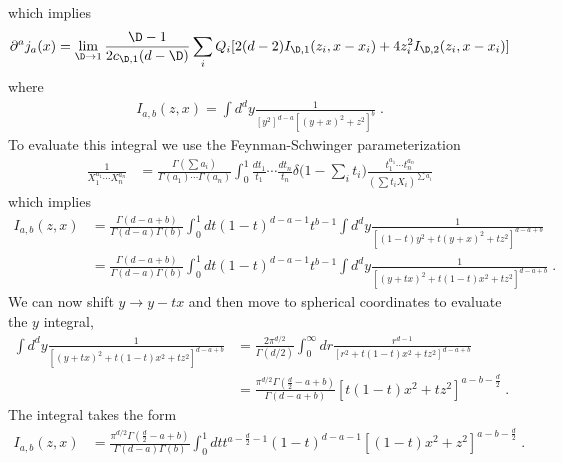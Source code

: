 \documentclass[11pt]{article}
\def\d{{\delta}}
\def\G{{\Gamma}}
\def\p{{\partial}}
\begin{document}
which implies 
\begin{equation}
\begin{split}\label{currentdiv-eval-app}
\p^a j_a(x) =  \lim_{\D \to 1 } \frac{\D-1}{2c_{\D,1}(d-\D)}  \sum_i Q_i [ 2 ( d - 2 ) I_{\D,1} ( z_i , x - x_i )  +  4 z_i^2 I_{\D,2} ( z_i , x - x_i ) ]
\end{split}
\end{equation}
where
\begin{equation}
\begin{split}\label{intab-def}
I_{a,b}(z,x) = \int d^d y \frac{1}{ [ y^2 ]^{d-a} [ ( y + x )^2 + z^2 ]^b } \; . 
\end{split}
\end{equation}
To evaluate this integral we use the Feynman-Schwinger parameterization
\begin{equation}
\begin{split}
\label{FSeq}
\frac{1}{X_1^{a_1} \cdots X_n^{a_n} } &= \frac{\G ( \sum a_i ) }{ \G ( a_1 ) \cdots \G ( a_n ) }\int_0^1 \frac{dt_1}{t_1} \cdots \frac{dt_n}{t_n}  \d \big( 1 - \sum_i t_i \big)  \frac{t_1^{a_1} \cdots t_n^{a_n} }{ ( \sum t_i X_i  )^{ \sum a_i } } 
\end{split}
\end{equation}
which implies
\begin{equation}
\begin{split}
I_{a,b}(z,x) &= \frac{\G(d-a+b)}{\G(d-a)\G(b)} \int_0^1 dt (1-t)^{d-a-1} t^{b-1} \int d^d y \frac{1}{ [ (1 - t ) y^2 + t ( y + x )^2 + t z^2 ]^{d-a+b} }  \\
&= \frac{\G(d-a+b)}{\G(d-a)\G(b)} \int_0^1 dt (1-t)^{d-a-1} t^{b-1} \int d^d y \frac{1}{ [ ( y + t x )^2 + t ( 1 - t ) x^2  + t z^2 ]^{d-a+b} } \; . 
\end{split}
\end{equation}
We can now shift $y \to y - t x$ and then move to spherical coordinates to evaluate the $y$ integral,
\begin{equation}
\begin{split}
\int d^d y \frac{1}{ [ ( y + t x )^2 + t ( 1 - t ) x^2  + t z^2 ]^{d-a+b} } &= \frac{2\pi^{d/2}}{\G(d/2)} \int_0^\infty dr \frac{r^{d-1} }{ [ r^2 + t ( 1 - t ) x^2  + t z^2 ]^{d-a+b} } \\
&=  \frac{ \pi^{d/2}\G ( \frac{d}{2} - a + b )   }{   \G (  d - a + b ) } [ t ( 1 - t ) x^2  + t z^2 ]^{a - b - \frac{d}{2} } \; . 
\end{split}
\end{equation}
The integral takes the form
\begin{equation}
\begin{split}
I_{a,b}(z,x) &= \frac{ \pi^{d/2}\G ( \frac{d}{2} - a + b )   }{ \G(d-a)\G(b) }  \int_0^1 dt t^{ a - \frac{d}{2} - 1 }   (1-t)^{d-a-1} [ ( 1 - t ) x^2  +  z^2 ]^{a - b - \frac{d}{2} } \; . 
\end{split}
\end{equation}
\end{document}
